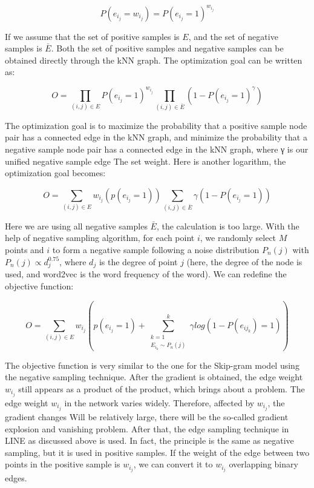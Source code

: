 \begin{equation*}
    P(e_i_j = w_i_j) = P(e_i_j = 1) ^ {w_i_j}
\end{equation*}

\noindent If we assume that the set of positive samples is $E$, and the set of negative samples is $\bar E$. Both the set of positive samples and negative samples can be obtained directly through the kNN graph. The optimization goal can be written as:

\begin{equation*}
    O = \prod_{(i,j)∈E} P(e_i_j = 1) ^ {w_i_j} \prod_{(i,j)∈\bar E} (1 - P(e_i_j = 1) ^ {\gamma}) 
\end{equation*}

\noindent The optimization goal is to maximize the probability that a positive sample node pair has a connected edge in the kNN graph, and minimize the probability that a negative sample node pair has a connected edge in the kNN graph, where γ is our unified negative sample edge The set weight. Here is another logarithm, the optimization goal becomes:

\begin{equation*}
    O =  \sum_{(i,j)∈E}  w_i_j(p(e_i_j = 1)) \sum_{(i,j)∈\bar E} \gamma (1 - P(e_i_j = 1))
\end{equation*}

\noindent Here we are using all negative samples $\bar E$, the calculation is too large. With the help of negative sampling algorithm, for each point $i$, we randomly select $M$ points and $i$ to form a negative sample following a noise distribution $P_n(j)$ with $P_n(j)∝d_j^{0. 75}$, where $d_j$ is the degree of point $j$ (here, the degree of the node is used, and word2vec is the word frequency of the word). We can redefine the objective function:

\begin{equation*}
    O =  \sum_{(i,j)∈E}  w_i_j(p(e_i_j = 1)  +\sum^k_{\substack{k=1\\ {E_{i_k} \sim P_n(j)}}} \gamma log (1 - P(e_{ij_{k}}) = 1))
\end{equation*}

\noindent The objective function is very similar to the one for the Skip-gram model using the negative sampling technique. After the gradient is obtained, the edge weight $w_i_j$ still appears as a product of the product, which brings about a problem. The edge weight $w_i_j$ in the network varies widely. Therefore, affected by $w_i_j$, the gradient changes Will be relatively large, there will be the so-called gradient explosion and vanishing problem. After that, the edge sampling technique in LINE as discussed above is used. In fact, the principle is the same as negative sampling, but it is used in positive samples. If the weight of the edge between two points in the positive sample is $w_i_j$, we can convert it to $w_i_j$ overlapping binary edges.\\

